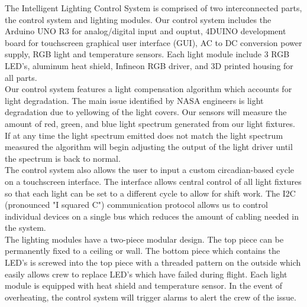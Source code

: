 \documentclass[12pt,a4paper]{report}
\begin{document}
The Intelligent Lighting Control System is comprised of two interconnected parts, the control system and lighting modules. Our control system includes the Arduino UNO R3 for analog/digital input and ouptut, 4DUINO development board for touchscreen graphical user interface (GUI), AC to DC conversion power supply, RGB light and temperature sensors. Each light module include 3 RGB LED's, aluminum heat shield, Infineon RGB driver, and 3D printed housing for all parts.\\ \linebreak
Our control system features a light compensation algorithm which accounts for light degradation. The main issue identified by NASA engineers is light degradation due to yellowing of the light covers. Our sensors will measure the amount of red, green, and blue light spectrum generated from our light fixtures. If at any time the light spectrum emitted does not match the light spectrum measured the algorithm will begin adjusting the output of the light driver until the spectrum is back to normal.\\ \linebreak
The control system also allows the user to input a custom circadian-based cycle on a touchscreen interface. The interface allows central control of all light fixtures so that each light can be set to a different cycle to allow for shift work. The I2C (pronounced "I squared C") communication protocol allows us to control individual devices on a single bus which reduces the amount of cabling needed in the system.\\ \linebreak
The lighting modules have a two-piece modular design. The top piece can be permanently fixed to a ceiling or wall. The bottom piece which contains the LED's is screwed into the top piece with a threaded pattern on the outside which easily allows crew to replace LED's which have failed during flight. Each light module is equipped with heat shield and temperature sensor. In the event of overheating, the control system will trigger alarms to alert the crew of the issue.
\end{document}
